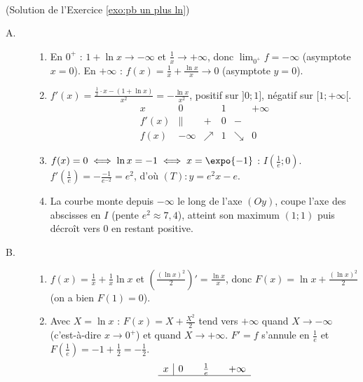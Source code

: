 \begin{corrige}
\begin{sol} ~ \\
(Solution de l'Exercice \ref{exo:pb un plus ln})
\begin{description}
\item[A.] \begin{enumerate}
      \item En $0^+$ : $1 + \ln x \to -\infty$ et $\frac{1}{x} \to +\infty$, donc $\lim_{0^+} f = -\infty$ (asymptote $x = 0$).
            En $+\infty$ : $f(x) = \frac{1}{x} + \frac{\ln x}{x} \to 0$ (asymptote $y = 0$).
      \item $f'(x) = \frac{\frac{1}{x} \cdot x - (1 + \ln x)}{x^2} = -\frac{\ln x}{x^2}$, positif sur $]0;1]$, n\'egatif sur $[1;+\infty[$.
            \[
            \begin{array}{c|ccccc}
            x & 0 & & 1 & & +\infty \\ \hline
            f'(x) & \| & + & 0 & - & \\ \hline
            f(x) & -\infty & \nearrow & 1 & \searrow & 0
            \end{array}
            \]
      \item $f(x) = 0 \iff \ln x = -1 \iff x = \expo{-1}$ : $I\left(\frac{1}{e} ; 0\right)$.
            $f'\left(\frac{1}{e}\right) = -\frac{-1}{e^{-2}} = e^2$, d'o\`u $\boxed{(T) : y = e^2 x - e}$.
      \item La courbe monte depuis $-\infty$ le long de l'axe $(Oy)$, coupe l'axe des abscisses en $I$ (pente $e^2 \approx 7{,}4$),
            atteint son maximum $(1 ; 1)$ puis d\'ecro\^it vers $0$ en restant positive.
      \end{enumerate}
\item[B.] \begin{enumerate}
      \item $f(x) = \frac{1}{x} + \frac{1}{x}\ln x$ et $\left( \frac{(\ln x)^2}{2} \right)' = \frac{\ln x}{x}$, donc
            $\boxed{F(x) = \ln x + \frac{(\ln x)^2}{2}}$ (on a bien $F(1) = 0$).
      \item Avec $X = \ln x$ : $F(x) = X + \frac{X^2}{2}$ tend vers $+\infty$ quand $X \to -\infty$ (c'est-\`a-dire $x \to 0^+$) et quand
            $X \to +\infty$. $F' = f$ s'annule en $\frac{1}{e}$ et $F\left(\frac{1}{e}\right) = -1 + \frac{1}{2} = -\frac{1}{2}$.
            \[
            \begin{array}{c|ccccc}
            x & 0 & & \frac{1}{e} & & +\infty \\ \hline

\end{array}\]
\end{enumerate}
\end{description}
\end{sol}
\end{corrige}
